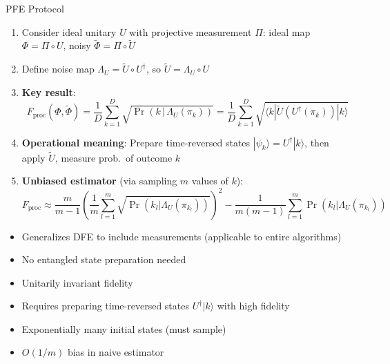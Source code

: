 \documentclass[10pt,a4paper]{article}
\begin{document}
\begin{algorithmbox}{PFE Protocol}
\begin{enumerate}
  \item Consider ideal unitary $U$ with projective measurement $\Pi$: ideal map $\Phi = \Pi \circ U$, noisy $\tilde{\Phi} = \Pi \circ \tilde{U}$
  \item Define noise map $\Lambda_U = \tilde{U} \circ U^\dagger$, so $\tilde{U} = \Lambda_U \circ U$
  \item \textcolor{alertred}{\textbf{Key result}}:
  \[
    \boxed{F_{\mathrm{proc}}(\Phi, \tilde{\Phi}) = \frac{1}{D}\sum_{k=1}^{D} \sqrt{\Pr\!\left(k \,|\, \Lambda_U(\pi_k)\right)} = \frac{1}{D}\sum_{k=1}^{D} \sqrt{\langle k|\tilde{U}(U^\dagger(\pi_k))|k\rangle}}
  \]
  \item \textbf{Operational meaning}: Prepare time-reversed states $|\psi_k\rangle = U^\dagger|k\rangle$, then apply $\tilde{U}$, measure prob.\ of outcome $k$
  \item \textbf{Unbiased estimator} (via sampling $m$ values of $k$):
  \[
    F_{\mathrm{proc}} \approx \frac{m}{m-1}\left(\frac{1}{m}\sum_{l=1}^m \sqrt{\Pr(k_l|\Lambda_U(\pi_{k_l}))}\right)^2 - \frac{1}{m(m-1)}\sum_{l=1}^m \Pr(k_l|\Lambda_U(\pi_{k_l}))
  \]
\end{enumerate}
\end{algorithmbox}

\begin{minipage}[t]{0.48\textwidth}
\begin{prosbox}
\begin{itemize}
  \item Generalizes DFE to include measurements (applicable to entire algorithms)
  \item No entangled state preparation needed
  \item Unitarily invariant fidelity
\end{itemize}
\end{prosbox}
\end{minipage}
\hfill
\begin{minipage}[t]{0.48\textwidth}
\begin{consbox}
\begin{itemize}
  \item Requires preparing time-reversed states $U^\dagger|k\rangle$ with high fidelity
  \item Exponentially many initial states (must sample)
  \item $O(1/m)$ bias in naive estimator
\end{itemize}
\end{consbox}
\end{minipage}
\end{document}
